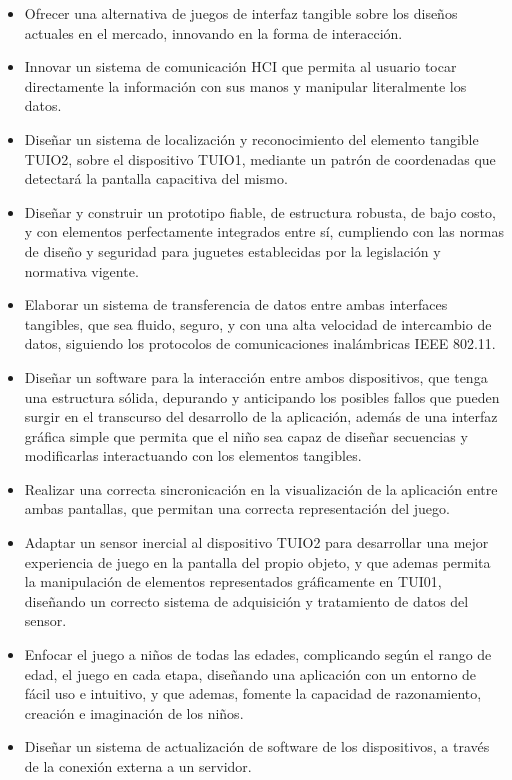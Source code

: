 \begin{itemize}
\item Ofrecer una alternativa de juegos de interfaz tangible sobre los diseños actuales en el mercado, innovando en la forma de interacción.

\item Innovar un sistema de comunicación HCI que permita al usuario tocar directamente la información
con sus manos y manipular literalmente los datos.

\item Diseñar un sistema de localización y reconocimiento del elemento tangible TUIO2, sobre el dispositivo TUIO1, mediante un patrón de coordenadas que detectará la pantalla capacitiva del mismo.

\item Diseñar y construir un prototipo fiable, de estructura robusta, de bajo costo, y con elementos perfectamente integrados entre sí, cumpliendo con las normas de diseño y seguridad para juguetes establecidas por la legislación y
normativa vigente.

\item Elaborar un sistema de transferencia de datos entre ambas interfaces tangibles, que sea fluido, seguro, y con una alta velocidad de intercambio de datos, siguiendo los protocolos de comunicaciones inalámbricas IEEE 802.11.

\item Diseñar un software para la interacción entre ambos dispositivos, que tenga una estructura sólida, depurando y anticipando los posibles fallos que pueden surgir en el transcurso del desarrollo de la aplicación, además de una interfaz gráfica simple que permita que el niño sea capaz de diseñar secuencias y modificarlas interactuando con los elementos tangibles.

\item Realizar una correcta sincronicación en la visualización de la aplicación entre ambas pantallas, que permitan una correcta representación del juego.

\item Adaptar un sensor inercial al dispositivo TUIO2 para desarrollar una mejor experiencia de juego en la pantalla del propio objeto, y que ademas permita la manipulación de elementos representados gráficamente en TUI01, diseñando un correcto sistema de adquisición y tratamiento de datos del sensor.

\item Enfocar el juego a niños de todas las edades, complicando según el rango de edad, el juego en cada etapa, diseñando una aplicación con un entorno de fácil uso e intuitivo, y que ademas, fomente la capacidad de razonamiento, creación e imaginación de los niños.

\item Diseñar un sistema de actualización de software de los dispositivos, a través de la conexión externa a un servidor.
\end{itemize}



